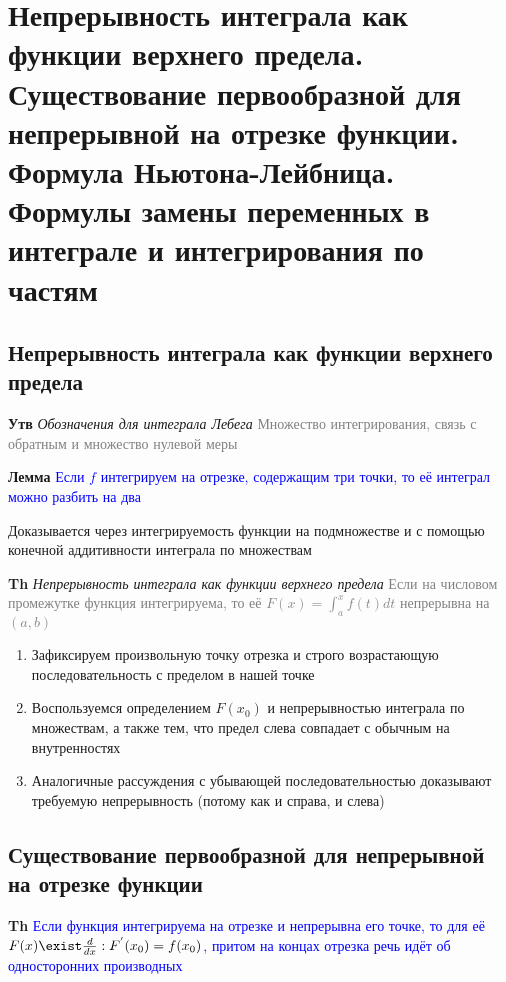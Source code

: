 \documentclass[a4paper, 14pt]{article}
\begin{document}
    

    \section{Непрерывность интеграла как функции верхнего предела.
    Существование первообразной для непрерывной на отрезке функции.
    Формула Ньютона-Лейбница.
    Формулы замены переменных в интеграле и интегрирования по частям}

    \subsection{Непрерывность интеграла как функции верхнего предела}

    \textbf{Утв} \textit{Обозначения для интеграла Лебега} \textcolor{gray}{Множество интегрирования, связь с
    обратным и множество нулевой меры}

    \textbf{Лемма} \textcolor{blue}{Если $f$ интегрируем на отрезке, содержащим три точки, то её интеграл можно разбить
    на два}

    Доказывается через интегрируемость функции на подмножестве и с помощью конечной аддитивности интеграла по множествам

    \textbf{Th} \textit{Непрерывность интеграла как функции верхнего предела} \textcolor{gray}{Если на числовом
    промежутке функция интегрируема, то её $F(x) = \int_a^x f(t)dt$ непрерывна на $(a, b)$}

    \begin{enumerate}
        \item Зафиксируем произвольную точку отрезка и строго возрастающую последовательность с пределом в нашей точке
        \item Воспользуемся определением $F(x_0)$ и непрерывностью интеграла по множествам, а также тем, что
        предел слева совпадает с обычным на внутренностях
        \item Аналогичные рассуждения с убывающей последовательностью доказывают требуемую непрерывность (потому как и
        справа, и слева)
    \end{enumerate}

    \subsection{Существование первообразной для непрерывной на отрезке функции}

    \textbf{Th} \textcolor{blue}{Если функция интегрируема на отрезке и непрерывна его точке, то для её $
    F(x) \exist \frac{d}{dx}: F^{'}(x_0) = f(x_0)$, притом на концах отрезка речь идёт об односторонних производных}
\end{document}
